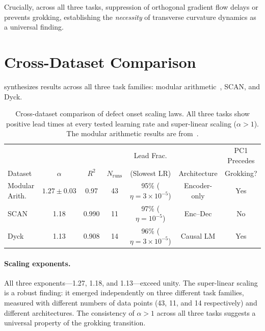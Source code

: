 \documentclass[11pt]{article}
\begin{document}
Crucially, across all three tasks, suppression of orthogonal gradient flow delays or prevents grokking, establishing the \emph{necessity} of transverse curvature dynamics as a universal finding.


\section{Cross-Dataset Comparison}
\label{sec:comparison}

 synthesizes results across all three task families: modular arithmetic~\citep{xu2026integrability}, SCAN, and Dyck.

\begin{table}[t]
  \centering
  \caption{Cross-dataset comparison of defect onset scaling laws. All three tasks show positive lead times at every tested learning rate and super-linear scaling ($\alpha > 1$). The modular arithmetic results are from~\citet{xu2026integrability}.}
  \label{tab:cross_dataset}
  \small
  \begin{tabular}{@{}lcccccc@{}}
    \toprule
    & & & & Lead Frac. & & PC1 Precedes \\
    Dataset & $\alpha$ & $R^2$ & $N_{\text{runs}}$ & (Slowest LR) & Architecture & Grokking? \\
    \midrule
    Modular Arith.\ \citep{xu2026integrability} & $1.27 \pm 0.03$ & 0.97 & 43 & 95\% ($\eta{=}3{\times}10^{-5}$) & Encoder-only & Yes \\
    SCAN & 1.18 & 0.990 & 11 & 97\% ($\eta{=}10^{-5}$) & Enc--Dec & No \\
    Dyck & 1.13 & 0.908 & 14 & 96\% ($\eta{=}3{\times}10^{-5}$) & Causal LM & Yes \\
    \bottomrule
  \end{tabular}
\end{table}

\paragraph{Scaling exponents.} All three exponents---1.27, 1.18, and 1.13---exceed unity. The super-linear scaling is a robust finding: it emerged independently on three different task families, measured with different numbers of data points (43, 11, and 14 respectively) and different architectures. The consistency of $\alpha > 1$ across all three tasks suggests a universal property of the grokking transition.
\end{document}
